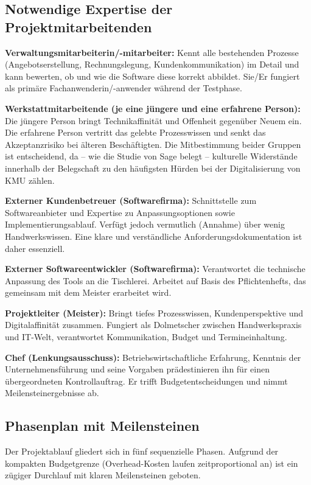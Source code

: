 \documentclass[
    a4paper,
    11pt,
    bibliography=totoc,
    listof=totoc,
    parskip=half,
    headings=normal
]{scrbook}
\begin{document}
\subsection{Notwendige Expertise der Projektmitarbeitenden}

\textbf{Verwaltungsmitarbeiterin/-mitarbeiter:} Kennt alle bestehenden Prozesse
(Angebotserstellung, Rechnungslegung, Kundenkommunikation) im Detail und kann
bewerten, ob und wie die Software diese korrekt abbildet. Sie/Er fungiert als
primäre Fachanwenderin/-anwender während der Testphase.

\textbf{Werkstattmitarbeitende (je eine jüngere und eine erfahrene Person):} Die
jüngere Person bringt Technikaffinität und Offenheit gegenüber Neuem ein. Die
erfahrene Person vertritt das gelebte Prozesswissen und senkt das Akzeptanzrisiko
bei älteren Beschäftigten\autocite[vgl.][Kap.~3]{Kiefer2010}. Die
Mitbestimmung beider Gruppen ist entscheidend, da -- wie die Studie von
Sage\autocite{Sage2024} belegt -- kulturelle Widerstände innerhalb der Belegschaft
zu den häufigsten Hürden bei der Digitalisierung von KMU zählen.

\textbf{Externer Kundenbetreuer (Softwarefirma):} Schnittstelle zum
Softwareanbieter und Expertise zu Anpassungsoptionen sowie Implementierungsablauf.
Verfügt jedoch vermutlich (Annahme) über wenig Handwerkswissen. Eine klare und verständliche Anforderungsdokumentation ist
daher essenziell.

\textbf{Externer Softwareentwickler (Softwarefirma):} Verantwortet die technische
Anpassung des Tools an die Tischlerei. Arbeitet auf Basis des Pflichtenhefts,
das gemeinsam mit dem Meister erarbeitet wird.

\textbf{Projektleiter (Meister):} Bringt tiefes Prozesswissen,
Kundenperspektive und Digitalaffinität zusammen. Fungiert als Dolmetscher
zwischen Handwerkspraxis und IT-Welt, verantwortet Kommunikation, Budget und
Termineinhaltung.

\textbf{Chef (Lenkungsausschuss):} Betriebswirtschaftliche Erfahrung,
Kenntnis der Unternehmensführung und seine Vorgaben prädestinieren ihn für einen übergeordneten
Kontrollauftrag. Er trifft Budgetentscheidungen und nimmt Meilensteinergebnisse
ab.

\subsection{Phasenplan mit Meilensteinen}

Der Projektablauf gliedert sich in fünf sequenzielle Phasen\autocite[vgl.][Kap.~2]{Mayer2014}. Aufgrund der kompakten Budgetgrenze
(Overhead-Kosten laufen zeitproportional an) ist ein zügiger Durchlauf mit
klaren Meilensteinen geboten.
\end{document}
